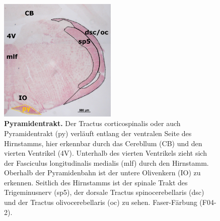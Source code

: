 \documentclass[12pt,a4paper,pdftex]{article}
\begin{document}
\begin{figure}[H]
    \centering
    \includegraphics[width=0.5\textwidth]{pictures/Bilder_Laura/py_F04_2P_025x.png}
    \caption[Pyramidentrakt]{\textbf{Pyramidentrakt.} Der Tractus corticospinalis oder auch Pyramidentrakt (py) verläuft entlang der ventralen Seite des Hirnstamms, hier erkennbar durch das Cerebllum (CB) und den vierten Ventrikel (4V). Unterhalb des vierten Ventrikels zieht sich der Fasciculus longitudinalis medialis (mlf) durch den Hirnstamm. Oberhalb der Pyramidenbahn ist der untere Olivenkern (IO) zu erkennen. Seitlich des Hirnstamms ist der spinale Trakt des Trigeminusnerv (sp5), der dorsale Tractus spinocerebellaris (dsc) und der Tractus olivocerebellaris (oc) zu sehen. Faser-Färbung (F04-2).}
    \label{fig:pyramidentrakt}
\end{figure}
\end{document}
